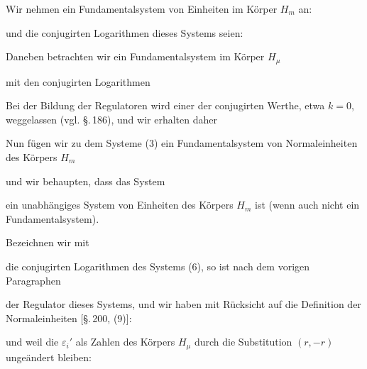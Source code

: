 
Wir nehmen ein Fundamentalsystem von Einheiten im Körper $H_m$ an:


und die conjugirten Logarithmen dieses Systems seien:


Daneben betrachten wir ein Fundamentalsystem im Körper $H_\mu$


mit den conjugirten Logarithmen


Bei der Bildung der Regulatoren wird einer der conjugirten Werthe, etwa $k=0$, weggelassen (vgl. \S.\,186), und wir erhalten daher


Nun fügen wir zu dem Systeme (3) ein Fundamentalsystem von Normaleinheiten des Körpers $H_m$


und wir behaupten, dass das System


ein unabhängiges System von Einheiten des Körpers $H_m$ ist (wenn auch nicht ein Fundamentalsystem).

Bezeichnen wir mit


die conjugirten Logarithmen des Systems (6), so ist nach dem vorigen Paragraphen


der Regulator dieses Systems, und wir haben mit Rücksicht auf die Definition der Normaleinheiten [\S.\,200, (9)]:


und weil die $\varepsilon_i'$ als Zahlen des Körpers $H_\mu$ durch die Substitution $(r,-r)$ ungeändert bleiben:

